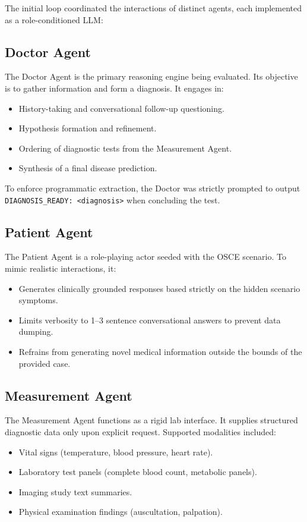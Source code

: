 The initial loop coordinated the interactions of distinct agents, each implemented as a role-conditioned LLM:

\subsection{Doctor Agent}
The Doctor Agent is the primary reasoning engine being evaluated. Its objective is to gather information and form a diagnosis. It engages in:
\begin{itemize}
    \item History-taking and conversational follow-up questioning.
    \item Hypothesis formation and refinement.
    \item Ordering of diagnostic tests from the Measurement Agent.
    \item Synthesis of a final disease prediction.
\end{itemize}
To enforce programmatic extraction, the Doctor was strictly prompted to output \texttt{DIAGNOSIS\_READY: <diagnosis>} when concluding the test.

\subsection{Patient Agent}
The Patient Agent is a role-playing actor seeded with the OSCE scenario. To mimic realistic interactions, it:
\begin{itemize}
    \item Generates clinically grounded responses based strictly on the hidden scenario symptoms.
    \item Limits verbosity to 1--3 sentence conversational answers to prevent data dumping.
    \item Refrains from generating novel medical information outside the bounds of the provided case.
\end{itemize}

\subsection{Measurement Agent}
The Measurement Agent functions as a rigid lab interface. It supplies structured diagnostic data only upon explicit request. Supported modalities included:
\begin{itemize}
    \item Vital signs (temperature, blood pressure, heart rate).
    \item Laboratory test panels (complete blood count, metabolic panels).
    \item Imaging study text summaries.
    \item Physical examination findings (auscultation, palpation).
\end{itemize}

